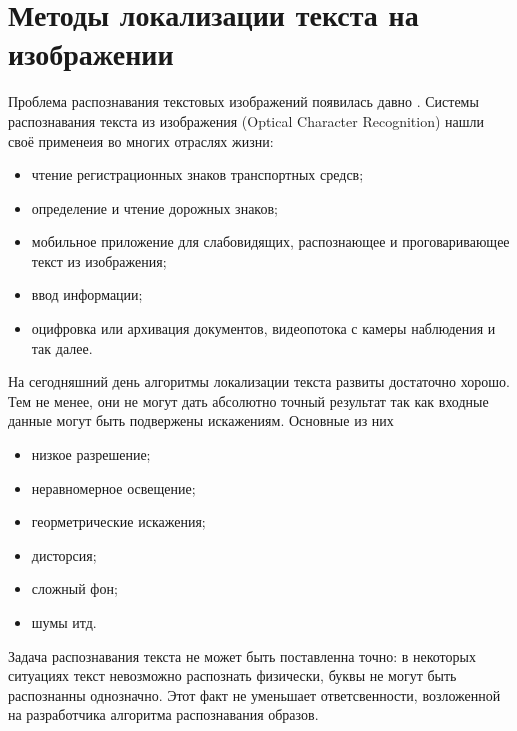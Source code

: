 \documentclass[oneside,final,14pt]{extreport}
\begin{document}
\chapter{Методы локализации текста на изображении}
Проблема распознавания текстовых изображений появилась давно \cite{JDAR_survey}. Системы распознавания текста из изображения (Optical Character Recognition) нашли своё применеия во многих отраслях жизни:

\begin{itemize}
\item чтение регистрационных знаков транспортных средсв;
\item определение и чтение дорожных знаков;

\item мобильное приложение для слабовидящих, распознающее и проговаривающее текст из изображения;

\item ввод информации;

\item оцифровка или архивация документов, видеопотока с камеры наблюдения и так далее.

\end{itemize}

На сегодняшний день алгоритмы локализации текста развиты достаточно хорошо. Тем не менее, они не могут дать абсолютно точный результат так как входные данные могут быть подвержены искажениям. Основные из них

\begin{itemize}

\item низкое разрешение; 

\item неравномерное освещение;

\item георметрические искажения;

\item дисторсия;

\item сложный фон;

\item шумы итд.

\end{itemize}

Задача распознавания текста не может быть поставленна точно: в некоторых ситуациях текст невозможно распознать физически, буквы не могут быть распознанны однозначно. Этот факт не уменьшает ответсвенности, возложенной на разработчика алгоритма распознавания образов.
\end{document}
